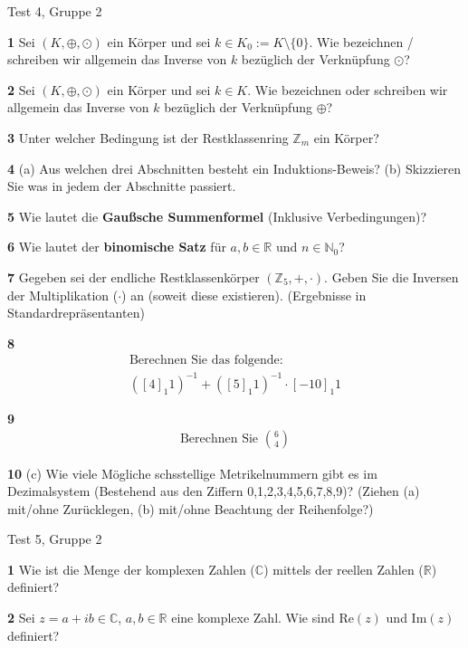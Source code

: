 \documentclass[11pt]{article}
\begin{document}
Test 4, Gruppe 2

    \textbf{1} Sei \((K, \oplus, \odot)\) ein Körper und sei \(k \in K_0 := K \setminus \{0\}\). Wie bezeichnen / schreiben wir allgemein das Inverse von \(k\) bezüglich der Verknüpfung \(\odot\)?

    \textbf{2} Sei \((K, \oplus, \odot)\) ein Körper und sei \(k \in K\). Wie bezeichnen oder schreiben wir allgemein das Inverse von \(k\) bezüglich der Verknüpfung \(\oplus\)?

    \textbf{3} Unter welcher Bedingung ist der Restklassenring \(\mathbb{Z}_m\) ein Körper?

    \textbf{4} (a) Aus welchen drei Abschnitten besteht ein Induktions-Beweis? (b) Skizzieren Sie was in jedem der Abschnitte passiert.
    
    \textbf{5} Wie lautet die \textbf{Gaußsche Summenformel} (Inklusive Verbedingungen)?

    \textbf{6} Wie lautet der \textbf{binomische Satz} für \( a, b \in \mathbb{R} \) und \( n \in \mathbb{N}_0 \)?

    \textbf{7} Gegeben sei der endliche Restklassenkörper \((\mathbb{Z}_5, +, \cdot)\). Geben Sie die Inversen der Multiplikation (\(\cdot\)) an (soweit diese existieren). (Ergebnisse in Standardrepräsentanten)

    \textbf{8} \[
                   \begin{gathered}
                       \text{Berechnen Sie das folgende:} \\
                       \left([4]_1 1\right)^{-1} + \left([5]_1 1\right)^{-1} \cdot [-10]_1 1
                   \end{gathered}
\]

    \textbf{9} \[
                   \begin{gathered}
                       \text{Berechnen Sie } \binom{6}{4}
                   \end{gathered}
\]

    \textbf{10} (c) Wie viele Mögliche schsstellige Metrikelnummern gibt es im Dezimalsystem (Bestehend aus den Ziffern {0,1,2,3,4,5,6,7,8,9})? (Ziehen (a) mit/ohne Zurücklegen, (b) mit/ohne Beachtung der Reihenfolge?)

Test 5, Gruppe 2

    \textbf{1} Wie ist die Menge der komplexen Zahlen (\(\mathbb{C}\)) mittels der reellen Zahlen (\(\mathbb{R}\)) definiert?

    \textbf{2} Sei \( z = a + ib \in \mathbb{C} \), \( a,b \in \mathbb{R} \) eine komplexe Zahl. Wie sind \( \text{Re}(z) \) und \( \text{Im}(z) \) definiert?
\end{document}
